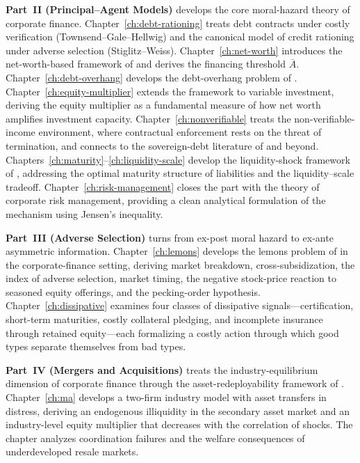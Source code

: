 \documentclass[11pt,a4paper,oneside]{book}
\theoremstyle{plain}
\theoremstyle{definition}
\theoremstyle{remark}
\numberwithin{equation}{chapter}
\begin{document}
\textbf{Part~II (Principal--Agent Models)} develops the core moral-hazard theory of corporate finance.
Chapter~\ref{ch:debt-rationing} treats debt contracts under costly verification (Townsend--Gale--Hellwig) and the canonical model of credit rationing under adverse selection (Stiglitz--Weiss).
Chapter~\ref{ch:net-worth} introduces the net-worth-based framework of \citet{HolmstromTirole1997} and derives the financing threshold $\overline{A}$.
Chapter~\ref{ch:debt-overhang} develops the debt-overhang problem of \citet{Myers1977}.
Chapter~\ref{ch:equity-multiplier} extends the framework to variable investment, deriving the equity multiplier as a fundamental measure of how net worth amplifies investment capacity.
Chapter~\ref{ch:nonverifiable} treats the non-verifiable-income environment, where contractual enforcement rests on the threat of termination, and connects to the sovereign-debt literature of \citet{BulowRogoff1989a, BulowRogoff1989b} and beyond.
Chapters~\ref{ch:maturity}--\ref{ch:liquidity-scale} develop the liquidity-shock framework of \citet{HolmstromTirole1998, HolmstromTirole2000}, addressing the optimal maturity structure of liabilities and the liquidity--scale tradeoff.
Chapter~\ref{ch:risk-management} closes the part with the theory of corporate risk management, providing a clean analytical formulation of the \citet{FrootScharfsteinStein1993} mechanism using Jensen's inequality.

\textbf{Part~III (Adverse Selection)} turns from ex-post moral hazard to ex-ante asymmetric information.
Chapter~\ref{ch:lemons} develops the lemons problem of \citet{Akerlof1970} in the corporate-finance setting, deriving market breakdown, cross-subsidization, the index of adverse selection, market timing, the negative stock-price reaction to seasoned equity offerings, and the pecking-order hypothesis.
Chapter~\ref{ch:dissipative} examines four classes of dissipative signals---certification, short-term maturities, costly collateral pledging, and incomplete insurance through retained equity---each formalizing a costly action through which good types separate themselves from bad types.

\textbf{Part~IV (Mergers and Acquisitions)} treats the industry-equilibrium dimension of corporate finance through the asset-redeployability framework of \citet{ShleiferVishny1992}.
Chapter~\ref{ch:ma} develops a two-firm industry model with asset transfers in distress, deriving an endogenous illiquidity in the secondary asset market and an industry-level equity multiplier that decreases with the correlation of shocks.
The chapter analyzes coordination failures and the welfare consequences of underdeveloped resale markets.
\end{document}
